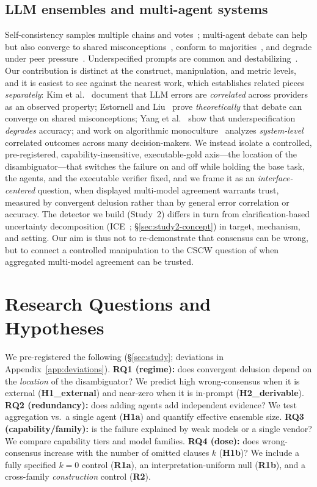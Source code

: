 \documentclass[acmsmall,screen,nonacm]{acmart}
\begin{document}
\subsection{LLM ensembles and multi-agent systems}
Self-consistency samples multiple chains and votes~\cite{wang2023selfconsistency}; multi-agent debate can
help~\cite{du2023debate,liang2024} but also converge to shared misconceptions~\cite{estornell2024}, conform
to majorities~\cite{choi2025conformity}, and degrade under peer pressure~\cite{wynn2025talk}. Underspecified
prompts are common and destabilizing~\cite{yang2025underspecification}. Our contribution is distinct at the
construct, manipulation, and metric levels, and it is easiest to see against the nearest work, which
establishes related pieces \emph{separately}: Kim et al.~\cite{kim2025correlated} document that LLM errors
are \emph{correlated} across providers as an observed property; Estornell and Liu~\cite{estornell2024} prove
\emph{theoretically} that debate can converge on shared misconceptions; Yang et al.~\cite{yang2025underspecification}
show that underspecification \emph{degrades} accuracy; and work on algorithmic
monoculture~\cite{kleinberg2021monoculture} analyzes \emph{system-level} correlated outcomes across many
decision-makers. We instead isolate a controlled, pre-registered, capability-insensitive, executable-gold
axis---the location of the disambiguator---that switches the failure on and off while holding the base task,
the agents, and the executable verifier fixed, and we frame it as an \emph{interface-centered} question, when
displayed multi-model agreement warrants trust, measured by convergent delusion rather than by general error
correlation or accuracy. The detector we build (Study~2) differs in turn from clarification-based uncertainty
decomposition (ICE~\cite{hou2024decomposing}; \S\ref{sec:study2-concept}) in target, mechanism, and setting.
Our aim is thus not to re-demonstrate that consensus can be wrong, but to connect a controlled manipulation to
the CSCW question of when aggregated multi-model agreement can be trusted.

\section{Research Questions and Hypotheses}
\label{sec:rqs}
We pre-registered the following (\S\ref{sec:study}; deviations in Appendix~\ref{app:deviations}).
\textbf{RQ1 (regime):} does convergent delusion depend on the \emph{location} of the disambiguator?
We predict high wrong-consensus when it is external (\textbf{H1\_external}) and near-zero when it is
in-prompt (\textbf{H2\_derivable}). \textbf{RQ2 (redundancy):} does adding agents add independent evidence?
We test aggregation vs.\ a single agent (\textbf{H1a}) and quantify effective ensemble size.
\textbf{RQ3 (capability/family):} is the failure explained by weak models or a single vendor? We compare
capability tiers and model families. \textbf{RQ4 (dose):} does wrong-consensus increase with the number of
omitted clauses $k$ (\textbf{H1b})? We include a fully specified $k{=}0$ control (\textbf{R1a}), an
interpretation-uniform null (\textbf{R1b}), and a cross-family \emph{construction} control (\textbf{R2}).
\end{document}
